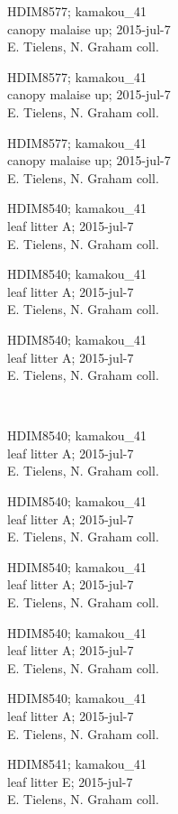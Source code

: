 \documentclass[2pt]{extarticle}
\begin{document}
\noindent
\parbox{0.16\textwidth}{\tiny \raggedright \rule[-0.3\baselineskip]{0pt}{10pt}HDIM8577; kamakou\_41\\ canopy malaise up; 2015-jul-7\\ E. Tielens, N. Graham coll.}
\parbox{0.16\textwidth}{\tiny \raggedright \rule[-0.3\baselineskip]{0pt}{10pt}HDIM8577; kamakou\_41\\ canopy malaise up; 2015-jul-7\\ E. Tielens, N. Graham coll.}
\parbox{0.16\textwidth}{\tiny \raggedright \rule[-0.3\baselineskip]{0pt}{10pt}HDIM8577; kamakou\_41\\ canopy malaise up; 2015-jul-7\\ E. Tielens, N. Graham coll.}
\parbox{0.16\textwidth}{\tiny \raggedright \rule[-0.3\baselineskip]{0pt}{10pt}HDIM8540; kamakou\_41\\ leaf litter A; 2015-jul-7\\ E. Tielens, N. Graham coll.}
\parbox{0.16\textwidth}{\tiny \raggedright \rule[-0.3\baselineskip]{0pt}{10pt}HDIM8540; kamakou\_41\\ leaf litter A; 2015-jul-7\\ E. Tielens, N. Graham coll.}
\parbox{0.16\textwidth}{\tiny \raggedright \rule[-0.3\baselineskip]{0pt}{10pt}HDIM8540; kamakou\_41\\ leaf litter A; 2015-jul-7\\ E. Tielens, N. Graham coll.} \\ 
\vspace{0.001in} 

\noindent
\parbox{0.16\textwidth}{\tiny \raggedright \rule[-0.3\baselineskip]{0pt}{10pt}HDIM8540; kamakou\_41\\ leaf litter A; 2015-jul-7\\ E. Tielens, N. Graham coll.}
\parbox{0.16\textwidth}{\tiny \raggedright \rule[-0.3\baselineskip]{0pt}{10pt}HDIM8540; kamakou\_41\\ leaf litter A; 2015-jul-7\\ E. Tielens, N. Graham coll.}
\parbox{0.16\textwidth}{\tiny \raggedright \rule[-0.3\baselineskip]{0pt}{10pt}HDIM8540; kamakou\_41\\ leaf litter A; 2015-jul-7\\ E. Tielens, N. Graham coll.}
\parbox{0.16\textwidth}{\tiny \raggedright \rule[-0.3\baselineskip]{0pt}{10pt}HDIM8540; kamakou\_41\\ leaf litter A; 2015-jul-7\\ E. Tielens, N. Graham coll.}
\parbox{0.16\textwidth}{\tiny \raggedright \rule[-0.3\baselineskip]{0pt}{10pt}HDIM8540; kamakou\_41\\ leaf litter A; 2015-jul-7\\ E. Tielens, N. Graham coll.}
\parbox{0.16\textwidth}{\tiny \raggedright \rule[-0.3\baselineskip]{0pt}{10pt}HDIM8541; kamakou\_41\\ leaf litter E; 2015-jul-7\\ E. Tielens, N. Graham coll.} \\ 
\vspace{0.001in} 
\end{document}
